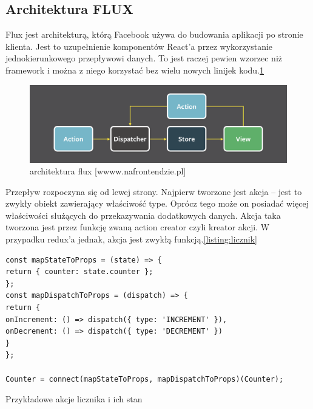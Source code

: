 \subsection{Architektura FLUX}

Flux jest architekturą, którą Facebook używa do budowania aplikacji po stronie klienta.
Jest to uzupełnienie komponentów React’a przez wykorzystanie jednokierunkowego przepływowi danych.
To jest raczej pewien wzorzec niż framework i można z niego korzystać  bez wielu nowych linijek kodu.\ref{rys:flux}

\begin{figure}
	\centering\includegraphics[width=.6\textwidth]{img/flux}
	\caption{architektura flux [wwww.nafrontendzie.pl]}\label{rys:flux}%
\end{figure}

Przepływ rozpoczyna się od lewej strony. Najpierw tworzone jest akcja – jest to zwykły obiekt zawierający właściwość type.
Oprócz tego może on posiadać więcej właściwości służących do przekazywania dodatkowych danych.
Akcja taka tworzona jest przez funkcję zwaną action creator czyli kreator akcji.
W przypadku redux'a jednak, akcja jest zwykłą funkcją.\ref{listing:licznik}

\begin{listing}
\begin{verbatim}
const mapStateToProps = (state) => {
return { counter: state.counter };
};
const mapDispatchToProps = (dispatch) => {
return {
onIncrement: () => dispatch({ type: 'INCREMENT' }),
onDecrement: () => dispatch({ type: 'DECREMENT' })
}
};

Counter = connect(mapStateToProps, mapDispatchToProps)(Counter);
\end{verbatim}
\caption{Przykładowe akcje licznika i ich stan} \label{listing:licznik}
\end{listing}

